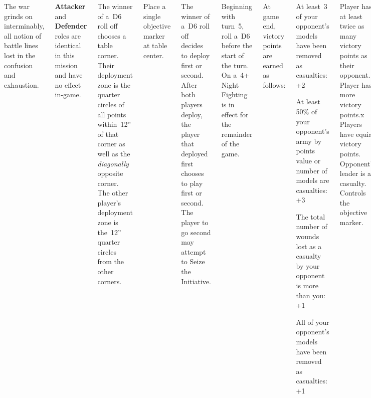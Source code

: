 
\begin{columns}

  The war grinds on interminably, all notion of battle lines lost in
  the confusion and exhaustion.

  \textbf{Attacker} and \textbf{Defender} roles are identical in this
  mission and have no effect in-game.

%

The winner of a~D6 roll off chooses a table corner.  Their deployment
zone is the quarter circles of all points within~12'' of that corner
as well as the \emph{diagonally} opposite corner.  The other player's
deployment zone is the~12'' quarter circles from the other corners.

Place a single objective marker at table center.

%

The winner of a~D6 roll off decides to deploy first or second.  After
both players deploy, the player that deployed first chooses to play
first or second.  The player to go second may attempt to Seize the
Initiative.

Beginning with turn~5, roll a~D6 before the start of the turn.  On
a~4+ Night Fighting is in effect for the remainder of the game.


\columnbreak
At game end, victory points are earned as follows:

\begin{squishitemize}
\item At least~3 of your opponent's models have been removed as
  casualties: +2

\item At least 50\% of your opponent's army by points value or number
  of models are casualties: +3

\item The total number of wounds lost as a casualty by your opponent
  is more than you: +1

\item All of your opponent's models have been removed as casualties:
  +1
\end{squishitemize}

\vspace*{-2pt}

\scoringbox%
{Player has at least twice as many victory points as their opponent.}%
{Player has more victory points.x}%
{Players have equial victory points.}%
{Opponent's leader is a casualty.}%
{Controls the objective marker.}

\end{columns}
